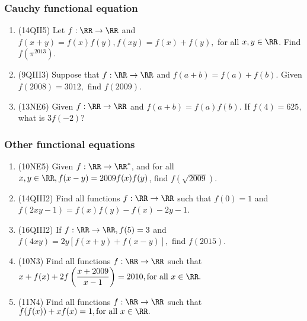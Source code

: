 \documentclass[10pt,paper=letter]{scrartcl}
\begin{document}
\subsubsection*{Cauchy functional equation}

\begin{enumerate}

\item (14QII5) Let $f: \RR \to \RR$ and $f(x+y)=f(x)f(y), f(xy)=f(x)+f(y),$ for all $x, y \in \RR$. Find $f(\pi^{2013})$.

\item (9QIII3) Suppose that $f: \RR \to \RR$ and $f(a+b) = f(a) + f(b)$. Given $f(2008) = 3012,$ find $f(2009)$.

\item (13NE6) Given $f: \RR \to \RR$ and $f(a+b) = f(a)f(b).$ If $f(4) = 625,$ what is $3f(-2)$?

\end{enumerate}

\subsubsection*{Other functional equations}

\begin{enumerate}

\item (10NE5) Given $f: \RR \to \RR^*$, and for all $x, y \in \RR, f(x-y) = 2009f(x)f(y)$, find $f(\sqrt{2009})$.

\item (14QIII2) Find all functions $f: \RR \to \RR$ such that $f(0) = 1$ and $f(2xy - 1) = f(x)f(y) - f(x) - 2y - 1$.


\item (16QIII2) If $f: \RR \to \RR, f(5) = 3$ and $f(4xy) = 2y[f(x+y)+f(x-y)],$ find $f(2015)$.

\item (10N3) Find all functions $f: \RR \to \RR$ such that $x+f(x)+2f\left(\dfrac{x+2009}{x-1}\right) = 2010, \text{for all } x \in \RR.$

\item (11N4) Find all functions $f: \RR \to \RR$ such that $f(f(x)) + xf(x) = 1, \text{for all } x \in \RR.$
\end{enumerate}
\end{document}

